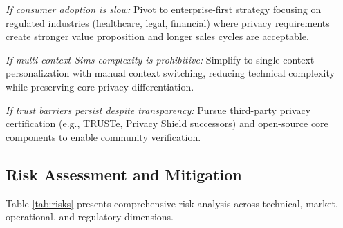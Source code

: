 \documentclass[11pt]{article}
\begin{document}
\textit{If consumer adoption is slow:} Pivot to enterprise-first strategy focusing on regulated industries (healthcare, legal, financial) where privacy requirements create stronger value proposition and longer sales cycles are acceptable.

\textit{If multi-context Sims complexity is prohibitive:} Simplify to single-context personalization with manual context switching, reducing technical complexity while preserving core privacy differentiation.

\textit{If trust barriers persist despite transparency:} Pursue third-party privacy certification (e.g., TRUSTe, Privacy Shield successors) and open-source core components to enable community verification.

\vspace*{-8pt}
\subsection{Risk Assessment and Mitigation}
\vspace*{-8pt}
Table \ref{tab:risks} presents comprehensive risk analysis across technical, market, operational, and regulatory dimensions.
\end{document}
